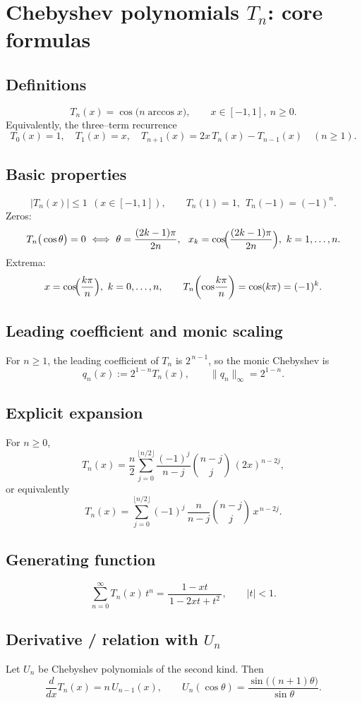 \documentclass[12pt,a4paper]{article}
\theoremstyle{plain}
\theoremstyle{definition}
\theoremstyle{remark}
\theoremstyle{remark}
\begin{document}
	
\section*{Chebyshev polynomials $T_n$: core formulas}

\subsection*{Definitions}
\[
T_n(x)=\cos\!\big(n\arccos x\big),\qquad x\in[-1,1],\ n\ge0.
\]
Equivalently, the three–term recurrence
\[
T_0(x)=1,\quad T_1(x)=x,\quad
T_{n+1}(x)=2x\,T_n(x)-T_{n-1}(x)\quad(n\ge1).
\]

\subsection*{Basic properties}
\[
|T_n(x)|\le 1\ \ (x\in[-1,1]),\qquad
T_n(1)=1,\ \ T_n(-1)=(-1)^n.
\]
Zeros:
\[
T_n\big(\cos\theta\big)=0\ \Longleftrightarrow\ 
\theta=\frac{(2k-1)\pi}{2n},\ \ x_k=\cos\!\Bigl(\frac{(2k-1)\pi}{2n}\Bigr),\ k=1,\dots,n.
\]
Extrema:
\[
x=\cos\!\Bigl(\frac{k\pi}{n}\Bigr),\ k=0,\dots,n,\qquad
T_n\!\left(\cos\!\frac{k\pi}{n}\right)=\cos(k\pi)=(-1)^k.
\]

\subsection*{Leading coefficient and monic scaling}
For $n\ge1$, the leading coefficient of $T_n$ is $2^{\,n-1}$, so the monic Chebyshev is
\[
q_n(x):=2^{1-n}T_n(x),\qquad \|q_n\|_\infty=2^{1-n}.
\]

\subsection*{Explicit expansion}
For $n\ge0$,
\[
T_n(x)
=\frac{n}{2}\sum_{j=0}^{\lfloor n/2\rfloor}
\frac{(-1)^j}{n-j}\binom{n-j}{j}\,(2x)^{n-2j},
\]
or equivalently
\[
T_n(x)=\sum_{j=0}^{\lfloor n/2\rfloor}
(-1)^j\,\frac{n}{n-j}\binom{n-j}{j}\,x^{\,n-2j}.
\]

\subsection*{Generating function}
\[
\sum_{n=0}^{\infty} T_n(x)\,t^n=\frac{1-xt}{\,1-2xt+t^2\,},\qquad |t|<1.
\]

\subsection*{Derivative / relation with $U_{n}$}
Let $U_{n}$ be Chebyshev polynomials of the second kind. Then
\[
\frac{d}{dx}T_n(x)=n\,U_{n-1}(x),\qquad
U_{n}(\cos\theta)=\frac{\sin\big((n+1)\theta\big)}{\sin\theta}.
\]
\end{document}
